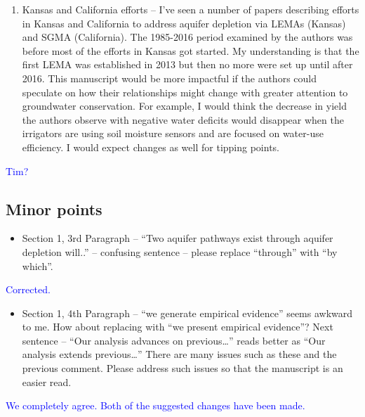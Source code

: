 \documentclass[
]{article}
\providecommand{\tightlist}{%
  \setlength{\itemsep}{0pt}\setlength{\parskip}{0pt}}
\begin{document}
\begin{enumerate}
\def\labelenumi{\arabic{enumi}.}
\setcounter{enumi}{4}
\tightlist
\item
  Kansas and California efforts -- I've seen a number of papers
  describing efforts in Kansas and California to address aquifer
  depletion via LEMAs (Kansas) and SGMA (California). The 1985-2016
  period examined by the authors was before most of the efforts in
  Kansas got started. My understanding is that the first LEMA was
  established in 2013 but then no more were set up until after 2016.
  This manuscript would be more impactful if the authors could speculate
  on how their relationships might change with greater attention to
  groundwater conservation. For example, I would think the decrease in
  yield the authors observe with negative water deficits would disappear
  when the irrigators are using soil moisture sensors and are focused on
  water-use efficiency. I would expect changes as well for tipping
  points.
\end{enumerate}

\textcolor{blue}{Tim?}

\hypertarget{minor-points}{%
\subsection{Minor points}\label{minor-points}}

\begin{itemize}
\tightlist
\item
  Section 1, 3rd Paragraph -- ``Two aquifer pathways exist through
  aquifer depletion will..'' -- confusing sentence -- please replace
  ``through'' with ``by which''.
\end{itemize}

\textcolor{blue}{Corrected.}

\begin{itemize}
\tightlist
\item
  Section 1, 4th Paragraph -- ``we generate empirical evidence'' seems
  awkward to me. How about replacing with ``we present empirical
  evidence''? Next sentence -- ``Our analysis advances on
  previous\ldots{}'' reads better as ``Our analysis extends
  previous\ldots{}'' There are many issues such as these and the
  previous comment. Please address such issues so that the manuscript is
  an easier read.
\end{itemize}

\textcolor{blue}{We completely agree. Both of the suggested changes have been made.}
\end{document}
